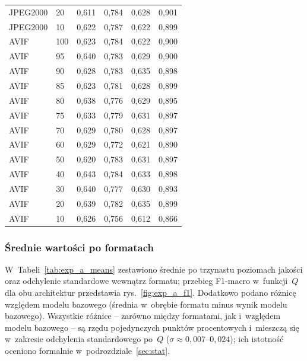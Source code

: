 \documentclass[12pt,a4paper]{article}
\begin{document}
\begin{table}[H]
\begin{tabular}{llcccc}
JPEG2000 & 20  & 0{,}611 & 0{,}784 & 0{,}628 & 0{,}901 \\
JPEG2000 & 10  & 0{,}622 & 0{,}787 & 0{,}622 & 0{,}899 \\
\midrule
AVIF & 100 & 0{,}623 & 0{,}784 & 0{,}622 & 0{,}900 \\
AVIF & 95  & 0{,}640 & 0{,}783 & 0{,}629 & 0{,}900 \\
AVIF & 90  & 0{,}628 & 0{,}783 & 0{,}635 & 0{,}898 \\
AVIF & 85  & 0{,}623 & 0{,}781 & 0{,}628 & 0{,}899 \\
AVIF & 80  & 0{,}638 & 0{,}776 & 0{,}629 & 0{,}895 \\
AVIF & 75  & 0{,}633 & 0{,}779 & 0{,}631 & 0{,}897 \\
AVIF & 70  & 0{,}629 & 0{,}780 & 0{,}628 & 0{,}897 \\
AVIF & 60  & 0{,}629 & 0{,}772 & 0{,}621 & 0{,}890 \\
AVIF & 50  & 0{,}620 & 0{,}783 & 0{,}631 & 0{,}897 \\
AVIF & 40  & 0{,}643 & 0{,}784 & 0{,}633 & 0{,}898 \\
AVIF & 30  & 0{,}640 & 0{,}777 & 0{,}630 & 0{,}893 \\
AVIF & 20  & 0{,}639 & 0{,}782 & 0{,}635 & 0{,}899 \\
AVIF & 10  & 0{,}626 & 0{,}756 & 0{,}612 & 0{,}866 \\
\bottomrule
\end{tabular}
\end{table}

\subsubsection{Średnie wartości po formatach}

W~Tabeli~\ref{tab:exp_a_means} zestawiono średnie po trzynastu poziomach jakości oraz odchylenie standardowe wewnątrz formatu; przebieg F1-macro w~funkcji~$Q$ dla obu architektur przedstawia rys.~\ref{fig:exp_a_f1}. Dodatkowo podano różnicę względem modelu bazowego (średnia w~obrębie formatu minus wynik modelu bazowego). Wszystkie różnice -- zarówno między formatami, jak i~względem modelu bazowego -- są rzędu pojedynczych punktów procentowych i~mieszczą się w~zakresie odchylenia standardowego po~$Q$ ($\sigma \approx 0{,}007$--$0{,}024$); ich istotność oceniono formalnie w~podrozdziale~\ref{sec:stat}.
\end{document}
